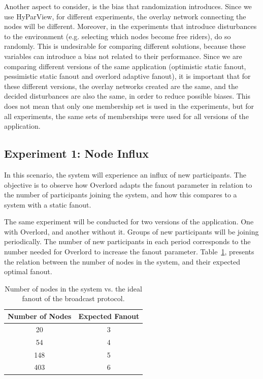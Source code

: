 Another aspect to consider, is the bias that randomization introduces. Since we use HyParView\cite{Leitao2007}, for different experiments, the overlay network connecting the nodes will be different. Moreover, in the experiments that introduce disturbances to the environment (e.g. selecting which nodes become free riders), do so randomly. This is undesirable for comparing different solutions, because these variables can introduce a bias not related to their performance. Since we are comparing different versions of the same application (optimistic static fanout, pessimistic static fanout and overlord adaptive fanout), it is important that for these different versions, the overlay networks created are the same, and the decided disturbances are also the same, in order to reduce possible biases. This does not mean that only one membership set is used in the experiments, but for all experiments, the same sets of memberships were used for all versions of the application.

\subsection{Experiment 1: Node Influx}
\label{ssec:node_influx_experiment}
In this scenario, the system will experience an influx of new participants. The objective is to observe how Overlord adapts the fanout parameter in relation to the number of participants joining the system, and how this compares to a system with a static fanout.

The same experiment will be conducted for two versions of the application. One with Overlord, and another without it. Groups of new participants will be joining periodically. The number of new participants in each period corresponds to the number needed for Overlord to increase the fanout parameter. Table~\ref{table:nodes_vs_fanout}, presents the relation between the number of nodes in the system, and their expected optimal fanout\cite{Leitao2007a}.

\begin{table}
    \centering
    \begin{tabular}{|c|c|}
    \hline
    Number of Nodes & Expected Fanout \\ \hline
    20              & 3               \\ \hline
    54              & 4               \\ \hline
    148             & 5               \\ \hline
    403             & 6               \\ \hline
    \end{tabular}
    \caption{Number of nodes in the system vs. the ideal fanout of the broadcast protocol.}
    \label{table:nodes_vs_fanout}
\end{table}

